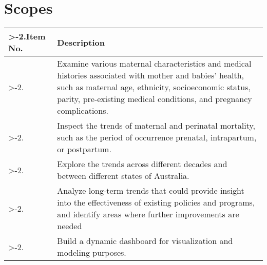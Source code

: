 \setcounter{rownum}{-1}

\section{Scopes}

\begin{tabular}{|>{\ifnum\value{rownum}>-2\relax\stepcounter{rownum}\therownum.\fi}l|l|}
\hline
Item No. & Description \\
\hline
& Examine various maternal characteristics and medical histories associated with mother and babies’ health, such as maternal age, ethnicity, socioeconomic status, parity, pre-existing medical conditions, and pregnancy complications. \\
& Inspect the trends of maternal and perinatal mortality, such as the period of occurrence prenatal, intrapartum, or postpartum.  \\
& Explore the trends across different decades and between different states of Australia. \\
& Analyze long-term trends that could provide insight into the effectiveness of existing policies and programs, and identify areas where further improvements are needed \\
& Build a dynamic dashboard for visualization and modeling purposes. \\
\hline
\end{tabular}

